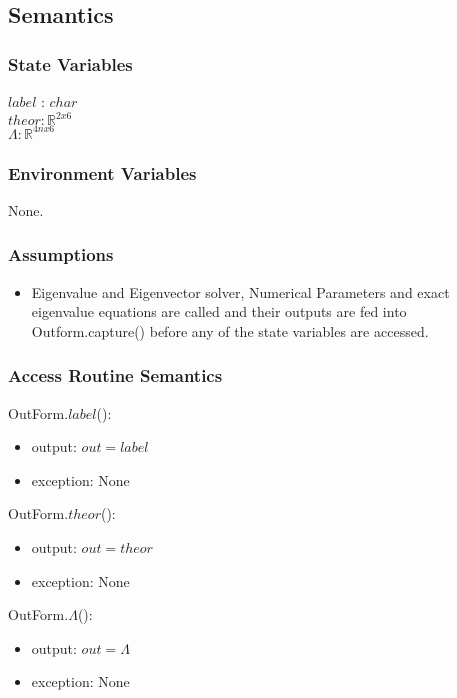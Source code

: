 \documentclass[12pt, titlepage]{article}
\begin{document}
\subsection{Semantics}

\subsubsection{State Variables}

$label$ : $char$ \\
$theor: \mathbb{R}^{2 x 6}$ \\
$\Lambda : \mathbb{R}^{4nx6}$

\subsubsection{Environment Variables}

None.

\subsubsection{Assumptions}

\begin{itemize}
	\item Eigenvalue and Eigenvector solver, 
	Numerical Parameters and exact eigenvalue equations 
	are called and their outputs are fed into Outform.capture() 
	before any of the state variables are accessed. 
\end{itemize}

\subsubsection{Access Routine Semantics}

\noindent OutForm.$label$():
\begin{itemize}
	\item output: $out = label$
	\item exception: None
\end{itemize}


\noindent OutForm.$theor$():
\begin{itemize}
	\item output: $out = theor$
	\item exception: None
\end{itemize} 

\noindent OutForm.$\Lambda$():
\begin{itemize}
	\item output: $out = \Lambda$
	\item exception: None
\end{itemize}
\end{document}
